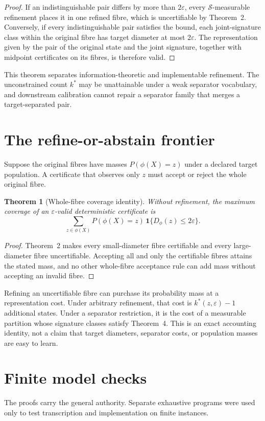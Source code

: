 \documentclass[10pt]{article}
\newtheorem{theorem}{Theorem}
\newcommand{\1}{\mathbf{1}}
\begin{document}
\begin{proof}
If an indistinguishable pair differs by more than $2\varepsilon$, every $\mathcal S$-measurable refinement places it in one refined fibre, which is uncertifiable by Theorem~2. Conversely, if every indistinguishable pair satisfies the bound, each joint-signature class within the original fibre has target diameter at most $2\varepsilon$. The representation given by the pair of the original state and the joint signature, together with midpoint certificates on its fibres, is therefore valid.
\end{proof}

This theorem separates information-theoretic and implementable refinement. The unconstrained count $k^*$ may be unattainable under a weak separator vocabulary, and downstream calibration cannot repair a separator family that merges a target-separated pair.

\section{The refine-or-abstain frontier}
Suppose the original fibres have masses $P(\phi(X)=z)$ under a declared target population. A certificate that observes only $z$ must accept or reject the whole original fibre.

\begin{theorem}[Whole-fibre coverage identity]
Without refinement, the maximum coverage of an $\varepsilon$-valid deterministic certificate is
\[
  \sum_{z\in\phi(X)}P(\phi(X)=z)\,\1\{D_\phi(z)\leq 2\varepsilon\}.
\]
\end{theorem}

\begin{proof}
Theorem~2 makes every small-diameter fibre certifiable and every large-diameter fibre uncertifiable. Accepting all and only the certifiable fibres attains the stated mass, and no other whole-fibre acceptance rule can add mass without accepting an invalid fibre.
\end{proof}

Refining an uncertifiable fibre can purchase its probability mass at a representation cost. Under arbitrary refinement, that cost is $k^*(z,\varepsilon)-1$ additional states. Under a separator restriction, it is the cost of a measurable partition whose signature classes satisfy Theorem~4. This is an exact accounting identity, not a claim that target diameters, separator costs, or population masses are easy to learn.

\section{Finite model checks}
The proofs carry the general authority. Separate exhaustive programs were used only to test transcription and implementation on finite instances.
\end{document}
